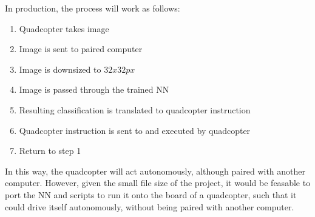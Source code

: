 \documentclass[12pt]{article}
\begin{document}
{	\quad In production, the process will work as follows:
	
	\begin{enumerate}
		\item{Quadcopter takes image}
		\item{Image is sent to paired computer}
		\item{Image is downsized to $32x32px$}
		\item{Image is passed through the trained NN}
		\item{Resulting classification is translated to quadcopter instruction}
		\item{Quadcopter instruction is sent to and executed by quadcopter}	
		\item{Return to step 1}
	\end{enumerate}
	
	\quad In this way, the quadcopter will act autonomously, although paired with another computer. 
	However, given the small file size of the project, it would be feasable to port the NN and scripts to run it onto the board of a quadcopter, such that it could drive itself autonomously, without being paired with another computer.

}
\end{document}
